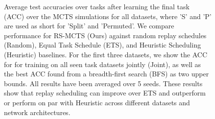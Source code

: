 

\begin{figure}[t]
  \centering
  \setlength{\figwidth}{0.23\textwidth}
  \setlength{\figheight}{.13\textheight}
  
  \vspace{-3mm}
  \caption{ Average test accuracies over tasks after learning the final task (ACC) over the MCTS simulations for all datasets, where 'S' and 'P' are used as short for 'Split' and 'Permuted'. We compare performance for RS-MCTS (Ours) against random replay schedules (Random), Equal Task Schedule (ETS), and Heuristic Scheduling (Heuristic) baselines. 
  	For the first three datasets, we show the ACC for for training on all seen task datasets jointly (Joint), as well as the best ACC found from a breadth-first search (BFS) as two upper bounds. All results have been averaged over 5 seeds. These results show that replay scheduling can improve over ETS and outperform or perform on par with Heuristic across different datasets and network architectures.
  }
  \label{fig:mcts_best_rewards}
  \vspace{-3mm}
\end{figure}


